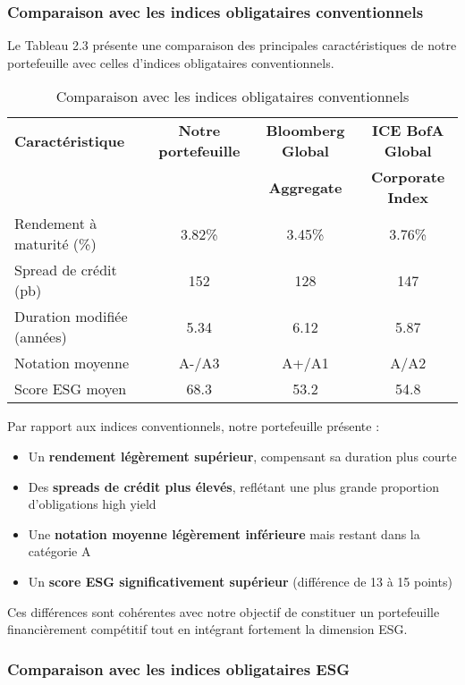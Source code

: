 \subsubsection{Comparaison avec les indices obligataires conventionnels}

Le Tableau 2.3 présente une comparaison des principales caractéristiques de notre portefeuille avec celles d'indices obligataires conventionnels.

\begin{table}[h]
\centering
\caption{Comparaison avec les indices obligataires conventionnels}
\begin{tabular}{lccc}
\hline
\textbf{Caractéristique} & \textbf{Notre portefeuille} & \textbf{Bloomberg Global} & \textbf{ICE BofA Global} \\
& & \textbf{Aggregate} & \textbf{Corporate Index} \\
\hline
Rendement à maturité (\%) & 3.82\% & 3.45\% & 3.76\% \\
Spread de crédit (pb) & 152 & 128 & 147 \\
Duration modifiée (années) & 5.34 & 6.12 & 5.87 \\
Notation moyenne & A-/A3 & A+/A1 & A/A2 \\
Score ESG moyen & 68.3 & 53.2 & 54.8 \\
\hline
\end{tabular}
\end{table}

Par rapport aux indices conventionnels, notre portefeuille présente :

\begin{itemize}
    \item Un \textbf{rendement légèrement supérieur}, compensant sa duration plus courte
    \item Des \textbf{spreads de crédit plus élevés}, reflétant une plus grande proportion d'obligations high yield
    \item Une \textbf{notation moyenne légèrement inférieure} mais restant dans la catégorie A
    \item Un \textbf{score ESG significativement supérieur} (différence de 13 à 15 points)
\end{itemize}

Ces différences sont cohérentes avec notre objectif de constituer un portefeuille financièrement compétitif tout en intégrant fortement la dimension ESG.

\subsubsection{Comparaison avec les indices obligataires ESG}

